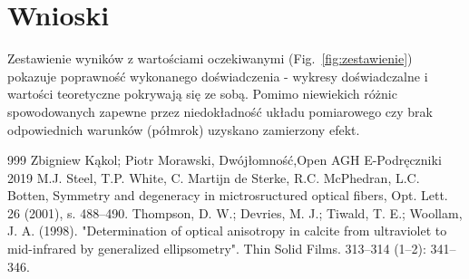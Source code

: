 \documentclass[quantumrep,article,accept,oneauthor,pdftex]{Definitions/mdpi}
\begin{document}
\section{Wnioski}
Zestawienie wyników z wartościami oczekiwanymi (Fig.~\ref{fig:zestawienie}) pokazuje
poprawność wykonanego doświadczenia - wykresy doświadczalne i wartości teoretyczne pokrywają
się ze sobą. Pomimo niewiekich różnic spowodowanych zapewne przez niedokładność
układu pomiarowego czy brak odpowiednich warunków (półmrok) uzyskano zamierzony
efekt.

\vspace{6pt} 




\newpage


%

\begin{thebibliography}{999}
\bibitem{}
Zbigniew Kąkol; Piotr Morawski, Dwójłomność,Open AGH E-Podręczniki 2019
\bibitem{}
M.J. Steel, T.P. White, C. Martijn de Sterke, R.C. McPhedran, L.C. Botten, Symmetry and degeneracy in mictrosructured optical fibers, Opt. Lett. 26 (2001), s. 488–490.
\bibitem{}
Thompson, D. W.; Devries, M. J.; Tiwald, T. E.; Woollam, J. A. (1998). "Determination of optical anisotropy in calcite from ultraviolet to mid-infrared by generalized ellipsometry". Thin Solid Films. 313–314 (1–2): 341–346. 
\end{thebibliography}
\end{document}
